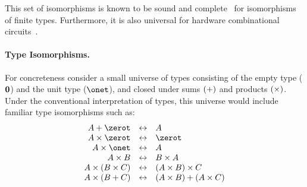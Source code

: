 

This set of isomorphisms is known to be sound and
complete~\cite{Fiore:2004,fiore-remarks} for isomorphisms
of finite types.  Furthermore, it is also universal
for hardware combinational
circuits~\cite{James:2012:IE:2103656.2103667}.



\paragraph*{Type Isomorphisms.} For concreteness consider a small universe of
types consisting of the empty type (${\mathbf{0}}$) and the unit type ($\onet$), and
closed under sums $(\mathbin{\mathsf{+}})$ and products $(\mathbin{\mathsf{\times}})$. Under the conventional
interpretation of types, this universe would include familiar type isomorphisms
such as:
\[\begin{array}{rcl}
    A \sumt \zerot &\isot& A \\
    A \prodt \zerot &\isot& \zerot \\
    A \prodt \onet &\isot& A \\
    A \prodt B &\isot& B \prodt A \\
    A \prodt (B \prodt C) &\isot& (A \prodt B) \prodt C \\
    A \prodt (B \sumt C) &\isot& (A \prodt B) \sumt (A \prodt C)
\end{array}\]


